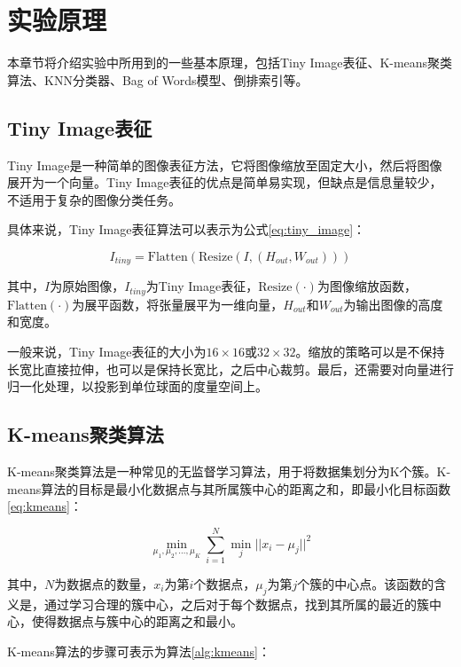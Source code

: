 \section{实验原理}

本章节将介绍实验中所用到的一些基本原理，包括Tiny Image表征、K-means聚类算法、KNN分类器、Bag of Words模型、倒排索引等。

\subsection{Tiny Image表征}

Tiny Image是一种简单的图像表征方法，它将图像缩放至固定大小，然后将图像展开为一个向量。Tiny Image表征的优点是简单易实现，但缺点是信息量较少，不适用于复杂的图像分类任务。

具体来说，Tiny Image表征算法可以表示为公式\ref{eq:tiny_image}：

\begin{equation}
    \label{eq:tiny_image}
    I_{tiny} = \text{Flatten}(\text{Resize}(I, (H_{out}, W_{out})))
\end{equation}

其中，$I$为原始图像，$I_{tiny}$为Tiny Image表征，$\text{Resize}(\cdot)$为图像缩放函数，$\text{Flatten}(\cdot)$为展平函数，将张量展平为一维向量，$H_{out}$和$W_{out}$为输出图像的高度和宽度。

一般来说，Tiny Image表征的大小为$16 \times 16$或$32 \times 32$。缩放的策略可以是不保持长宽比直接拉伸，也可以是保持长宽比，之后中心裁剪。最后，还需要对向量进行归一化处理，以投影到单位球面的度量空间上。

\subsection{K-means聚类算法}

K-means聚类算法是一种常见的无监督学习算法，用于将数据集划分为K个簇。K-means算法的目标是最小化数据点与其所属簇中心的距离之和，即最小化目标函数\ref{eq:kmeans}：

\begin{equation}
    \label{eq:kmeans}
    \min_{\mu_1, \mu_2, \ldots, \mu_K} \sum_{i=1}^{N} \min_{j} ||x_i - \mu_j||^2
\end{equation}

其中，$N$为数据点的数量，$x_i$为第$i$个数据点，$\mu_j$为第$j$个簇的中心点。该函数的含义是，通过学习合理的簇中心，之后对于每个数据点，找到其所属的最近的簇中心，使得数据点与簇中心的距离之和最小。

K-means算法的步骤可表示为算法\ref{alg:kmeans}：

